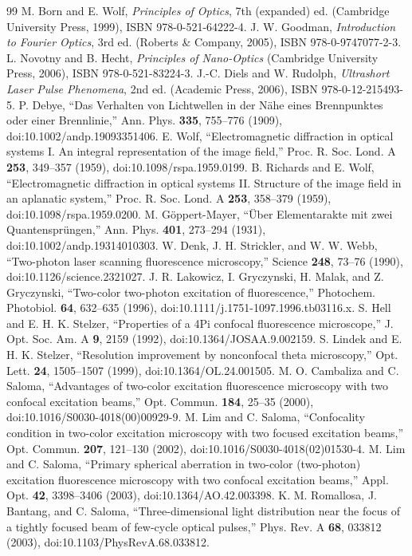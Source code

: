 \documentclass[11pt]{article}
\begin{document}
\begin{thebibliography}{99}\small
{} M. Born and E. Wolf, \emph{Principles of Optics}, 7th (expanded) ed. (Cambridge University
Press, 1999), ISBN 978-0-521-64222-4.
 J. W. Goodman, \emph{Introduction to Fourier Optics}, 3rd ed. (Roberts \& Company, 2005),
ISBN 978-0-9747077-2-3.
 L. Novotny and B. Hecht, \emph{Principles of Nano-Optics} (Cambridge University Press,
2006), ISBN 978-0-521-83224-3.
 J.-C. Diels and W. Rudolph, \emph{Ultrashort Laser Pulse Phenomena}, 2nd ed.
(Academic Press, 2006), ISBN 978-0-12-215493-5.
 P. Debye, ``Das Verhalten von Lichtwellen in der Nähe eines Brennpunktes oder einer
Brennlinie,'' Ann. Phys. \textbf{335}, 755--776 (1909), doi:10.1002/andp.19093351406.
 E. Wolf, ``Electromagnetic diffraction in optical systems I. An integral representation of
the image field,'' Proc. R. Soc. Lond. A \textbf{253}, 349--357 (1959), doi:10.1098/rspa.1959.0199.
 B. Richards and E. Wolf, ``Electromagnetic diffraction in optical systems II. Structure
of the image field in an aplanatic system,'' Proc. R. Soc. Lond. A \textbf{253}, 358--379 (1959),
doi:10.1098/rspa.1959.0200.
 M. Göppert-Mayer, ``Über Elementarakte mit zwei Quantensprüngen,'' Ann. Phys.
\textbf{401}, 273--294 (1931), doi:10.1002/andp.19314010303.
 W. Denk, J. H. Strickler, and W. W. Webb, ``Two-photon laser scanning fluorescence
microscopy,'' Science \textbf{248}, 73--76 (1990), doi:10.1126/science.2321027.
 J. R. Lakowicz, I. Gryczynski, H. Malak, and Z. Gryczynski, ``Two-color two-photon
excitation of fluorescence,'' Photochem. Photobiol. \textbf{64}, 632--635 (1996),
doi:10.1111/j.1751-1097.1996.tb03116.x.
 S. Hell and E. H. K. Stelzer, ``Properties of a 4Pi confocal fluorescence microscope,''
J. Opt. Soc. Am. A \textbf{9}, 2159 (1992), doi:10.1364/JOSAA.9.002159.
 S. Lindek and E. H. K. Stelzer, ``Resolution improvement by nonconfocal theta microscopy,''
Opt. Lett. \textbf{24}, 1505--1507 (1999), doi:10.1364/OL.24.001505.
 M. O. Cambaliza and C. Saloma, ``Advantages of two-color excitation fluorescence microscopy with
two confocal excitation beams,'' Opt. Commun. \textbf{184}, 25--35 (2000), doi:10.1016/S0030-4018(00)00929-9.
 M. Lim and C. Saloma, ``Confocality condition in two-color excitation microscopy with two focused
excitation beams,'' Opt. Commun. \textbf{207}, 121--130 (2002), doi:10.1016/S0030-4018(02)01530-4.
 M. Lim and C. Saloma, ``Primary spherical aberration in two-color (two-photon) excitation
fluorescence microscopy with two confocal excitation beams,'' Appl. Opt. \textbf{42}, 3398--3406 (2003),
doi:10.1364/AO.42.003398.
 K. M. Romallosa, J. Bantang, and C. Saloma, ``Three-dimensional light distribution near the focus
of a tightly focused beam of few-cycle optical pulses,'' Phys. Rev. A \textbf{68}, 033812 (2003),
doi:10.1103/PhysRevA.68.033812.
\end{thebibliography}
\end{document}
